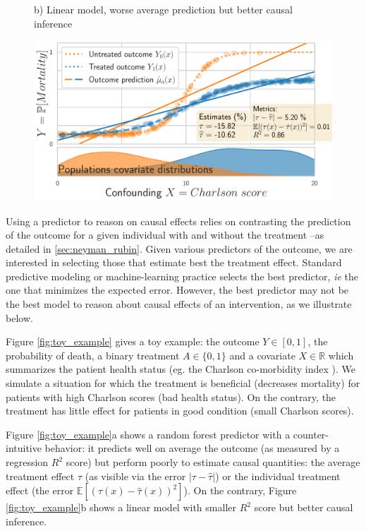 \documentclass[10pt]{article}
\begin{document}
\begin{multicols}{2}
\begin{figure}[b!]
\begin{minipage}{.577\linewidth}
            {\sffamily\small b) Linear model, worse average prediction but better causal inference}

            \hfill%
            \includegraphics[width=1\linewidth]{images/toy_tlinear_model_small_R2_small_tau_risk.pdf}%
        \end{minipage}%
    \end{figure}

    Using a predictor to reason on causal effects relies on contrasting the
    prediction of the outcome for a given individual with and without the
    treatment --as detailed in \autoref{sec:neyman_rubin}.
    Given various predictors of the outcome, we are interested in
    selecting those that estimate best the treatment effect.
    Standard predictive modeling or machine-learning practice selects the
    best predictor, \emph{ie} the one that minimizes the expected error.
    However, the best predictor may not be the best model to reason about
    causal effects of an intervention, as we illustrate below.

    Figure \ref{fig:toy_example} gives a toy example: the
    outcome $Y \in [0, 1]$, the
    probability of death, a binary treatment $A \in \{0, 1\}$ and a covariate
    $X \in \mathbb R$ which summarizes the patient health status (eg. the
    Charlson co-morbidity index \cite{charlson_new_1987}). We simulate a
    situation for which the treatment is beneficial (decreases
    mortality) for patients with high Charlson scores (bad health
    status). On the contrary, the treatment has little effect for patients in good
    condition (small Charlson scores).


    Figure \ref{fig:toy_example}a shows a random forest predictor with a
    counter-intuitive behavior: it predicts well on average the outcome (as
    measured by a regression $R^2$ score) but perform poorly to estimate
    causal quantities: the average treatment effect $\tau$ (as visible via
    the error $|\tau - \hat{\tau}|$) or the individual treatment
    effect (the error $\mathbb{E}[(\tau(x) - \hat{\tau}(x))^2]$).
    On the contrary, Figure \ref{fig:toy_example}b shows a linear model with
    smaller $R^2$ score but better causal inference.%


\end{multicols}
\end{document}
